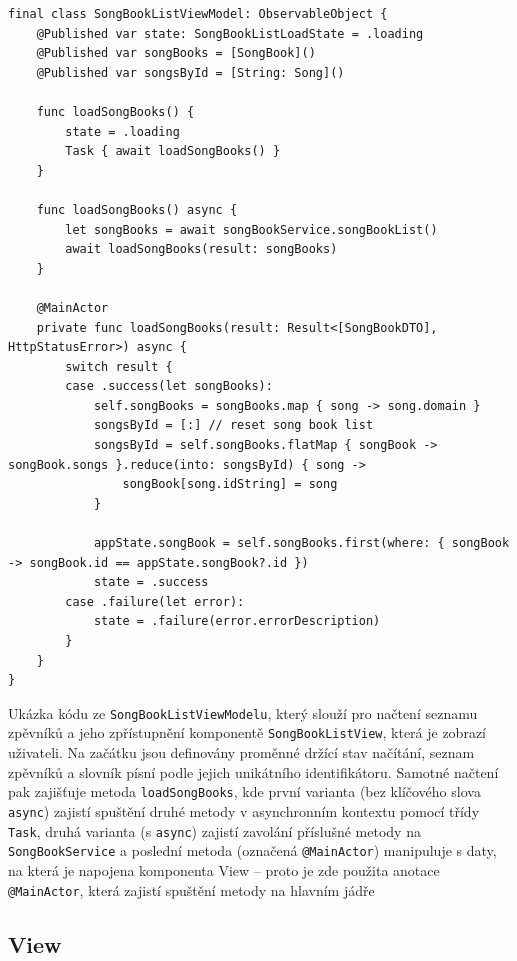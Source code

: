 \begin{listing}[H]
\begin{verbatim}
final class SongBookListViewModel: ObservableObject {
    @Published var state: SongBookListLoadState = .loading
    @Published var songBooks = [SongBook]()
    @Published var songsById = [String: Song]()
    
    func loadSongBooks() {
        state = .loading
        Task { await loadSongBooks() }
    }
    
    func loadSongBooks() async {
        let songBooks = await songBookService.songBookList()
        await loadSongBooks(result: songBooks)
    }
    
    @MainActor
    private func loadSongBooks(result: Result<[SongBookDTO], HttpStatusError>) async {
        switch result {
        case .success(let songBooks):
            self.songBooks = songBooks.map { song -> song.domain }
            songsById = [:] // reset song book list
            songsById = self.songBooks.flatMap { songBook -> songBook.songs }.reduce(into: songsById) { song ->
                songBook[song.idString] = song
            }
            
            appState.songBook = self.songBooks.first(where: { songBook -> songBook.id == appState.songBook?.id })
            state = .success
        case .failure(let error):
            state = .failure(error.errorDescription)
        }
    }
}
\end{verbatim}
\caption[Ukázka kódu z ViewModelu pro načtení seznamu zpěvníků v aplikaci]{Ukázka kódu ze \texttt{SongBookListViewModelu}, který slouží pro načtení seznamu zpěvníků a jeho zpřístupnění komponentě \texttt{SongBookListView}, která je zobrazí uživateli. Na začátku jsou definovány proměnné držící stav načítání, seznam zpěvníků a slovník písní podle jejich unikátního identifikátoru. Samotné načtení pak zajišťuje metoda  \texttt{loadSongBooks}, kde první varianta (bez klíčového slova \texttt{async}) zajistí spuštění druhé metody v asynchronním kontextu pomocí třídy \texttt{Task}, druhá varianta (s \texttt{async}) zajistí zavolání příslušné metody na \texttt{SongBookService} a poslední metoda (označená \texttt{@MainActor}) manipuluje s daty, na která je napojena komponenta View -- proto je zde použita anotace \texttt{@MainActor}, která zajistí spuštění metody na hlavním jádře}
\end{listing}

\subsection{View}

